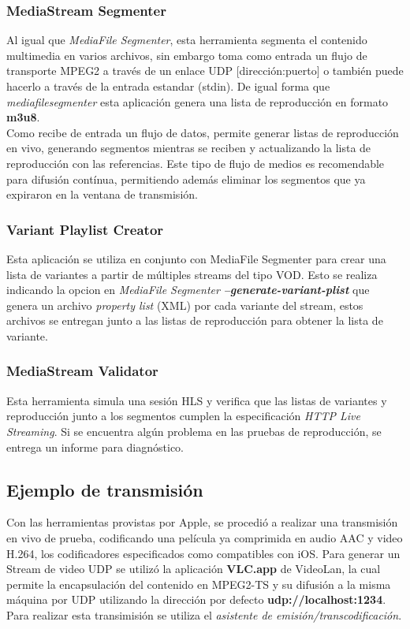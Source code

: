 		\subsubsection{MediaStream Segmenter}
Al igual que \textit{MediaFile Segmenter}, esta herramienta segmenta el contenido multimedia en varios archivos, sin embargo toma como entrada un flujo de transporte MPEG2 a través de un enlace UDP [dirección:puerto] o también puede hacerlo a través de la entrada estandar (stdin). De igual forma que \textit{mediafilesegmenter} esta aplicación genera una lista de reproducción en formato \textbf{m3u8}.\\

Como recibe de entrada un flujo de datos, permite generar listas de reproducción en vivo, generando segmentos mientras se reciben y actualizando la lista de reproducción con las referencias. Este tipo de flujo de medios es recomendable para difusión contínua, permitiendo además eliminar los segmentos que ya expiraron en la ventana de transmisión.

		\subsubsection{Variant Playlist Creator}
		Esta aplicación se utiliza en conjunto con MediaFile Segmenter para crear una lista de variantes a partir de múltiples streams del tipo VOD. Esto se realiza indicando la opcion en \textit{MediaFile Segmenter} \textit{\textbf{--generate-variant-plist}} que genera un archivo \textit{property list} (XML) por cada variante del stream, estos archivos se entregan junto a las listas de reproducción para obtener la lista de variante.
			
		\subsubsection{MediaStream Validator}		
		Esta herramienta simula una sesión HLS y verifica que las listas de variantes y reproducción junto a los segmentos cumplen la especificación \textit{HTTP Live Streaming}. Si se encuentra algún problema en las pruebas de reproducción, se entrega un informe para diagnóstico.
		
	\subsection{Ejemplo de transmisión}

Con las herramientas provistas por Apple, se procedió a realizar una transmisión en vivo de prueba, codificando una película ya comprimida en audio AAC y video H.264, los codificadores especificados como compatibles con iOS. Para generar un Stream de video UDP se utilizó la aplicación \textbf{VLC.app} de VideoLan, la cual permite la encapsulación del contenido en MPEG2-TS y su difusión a la misma máquina por UDP utilizando la dirección por defecto \textbf{udp://localhost:1234}. Para realizar esta transimisión se utiliza el \textit{asistente de emisión/transcodificación}.\\

